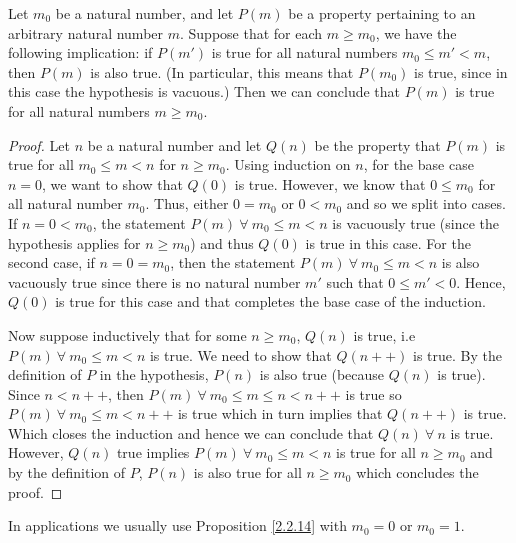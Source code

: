 \begin{proposition}\label{2.2.14}
Let \(m_0\) be a natural number, and let \(P(m)\) be a property pertaining to an arbitrary natural number \(m\).
Suppose that for each \(m \geq m_0\), we have the following implication: if \(P(m')\) is true for all natural numbers \(m_0 \leq m' < m\), then \(P(m)\) is also true.
(In particular, this means that \(P(m_0)\) is true, since in this case the hypothesis is vacuous.)
Then we can conclude that \(P(m)\) is true for all natural numbers \(m \geq m_0\).
\end{proposition}

\begin{proof}
Let \(n\) be a natural number and let \(Q(n)\) be the property that \(P(m)\) is true for all \(m_0 \leq m < n\) for \(n \geq m_0\).
Using induction on \(n\), for the base case \(n = 0\), we want to show that \(Q(0)\) is true.
However, we know that \(0 \leq m_0\) for all natural number \(m_0\).
Thus, either \(0 = m_0\) or \(0 < m_0\) and so we split into cases.
If \(n = 0 < m_0\), the statement \(P(m) \ \forall\ m_0 \leq m < n\) is vacuously true (since the hypothesis applies for \(n \geq m_0\)) and thus \(Q(0)\) is true in this case.
For the second case, if \(n = 0 = m_0\), then the statement \(P(m) \ \forall\ m_0 \leq m < n\) is also vacuously true since there is no natural number \(m'\) such that \(0 \leq m' < 0\). Hence, \(Q(0)\) is true for this case and that completes the base case of the induction.

Now suppose inductively that for some \(n \geq m_0\), \(Q(n)\) is true, i.e \(P(m) \ \forall\ m_0 \leq m < n\) is true.
We need to show that \(Q(n++)\) is true.
By the definition of \(P\) in the hypothesis, \(P(n)\) is also true (because \(Q(n)\) is true).
Since \(n < n++\), then \(P(m) \ \forall\ m_0 \leq m \leq n < n++\) is true so \(P(m) \ \forall\ m_0 \leq m < n++\) is true which in turn implies that \(Q(n++)\) is true.
Which closes the induction and hence we can conclude that \(Q(n) \ \forall\ n\) is true.
However, \(Q(n)\) true implies \(P(m) \ \forall\ m_0 \leq m < n\) is true for all \(n \geq m_0\) and by the definition of \(P\), \(P(n)\) is also true for all \(n \geq m_0\) which concludes the proof.
\end{proof}

\begin{remark}\label{2.2.15}
In applications we usually use Proposition \ref{2.2.14} with \(m_0 = 0\) or \(m_0 = 1\).
\end{remark}

